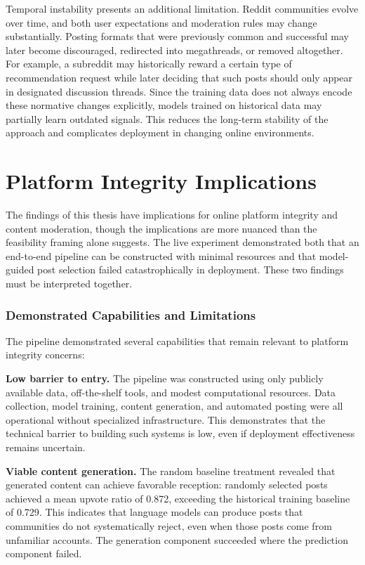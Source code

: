 Temporal instability presents an additional limitation. Reddit communities evolve over time, and both user expectations and moderation rules may change substantially. Posting formats that were previously common and successful may later become discouraged, redirected into megathreads, or removed altogether. For example, a subreddit may historically reward a certain type of recommendation request while later deciding that such posts should only appear in designated discussion threads. Since the training data does not always encode these normative changes explicitly, models trained on historical data may partially learn outdated signals. This reduces the long-term stability of the approach and complicates deployment in changing online environments.

\section{Platform Integrity Implications}

The findings of this thesis have implications for online platform integrity and content moderation, though the implications are more nuanced than the feasibility framing alone suggests. The live experiment demonstrated both that an end-to-end pipeline can be constructed with minimal resources and that model-guided post selection failed catastrophically in deployment. These two findings must be interpreted together.

\subsubsection*{Demonstrated Capabilities and Limitations}

The pipeline demonstrated several capabilities that remain relevant to platform integrity concerns:

\textbf{Low barrier to entry.} The pipeline was constructed using only publicly available data, off-the-shelf tools, and modest computational resources. Data collection, model training, content generation, and automated posting were all operational without specialized infrastructure. This demonstrates that the technical barrier to building such systems is low, even if deployment effectiveness remains uncertain.

\textbf{Viable content generation.} The random baseline treatment revealed that generated content can achieve favorable reception: randomly selected posts achieved a mean upvote ratio of 0.872, exceeding the historical training baseline of 0.729. This indicates that language models can produce posts that communities do not systematically reject, even when those posts come from unfamiliar accounts. The generation component succeeded where the prediction component failed.

